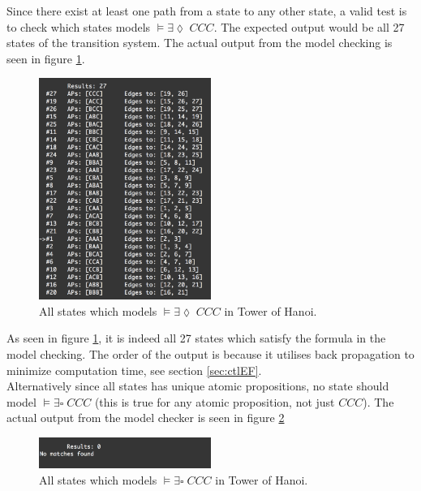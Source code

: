 Since there exist at least one path from a state to any other state, a valid test is to check which states models $\models \exists \lozenge \; CCC$. The expected output would be all 27 states of the transition system. The actual output from the model checking is seen in figure \ref{fig:tohEFCCC}.\\

\begin{figure}[H]
    \centering
    \includegraphics[width=0.5\textwidth]{fig/tohEFCCC.png}
    \caption{All states which models $\models \exists \lozenge \; CCC$ in Tower of Hanoi.}
    \label{fig:tohEFCCC}
\end{figure}

As seen in figure \ref{fig:tohEFCCC}, it is indeed all 27 states which satisfy the formula in the model checking. The order of the output is because it utilises back propagation to minimize computation time, see section \ref{sec:ctlEF}. \\

Alternatively since all states has unique atomic propositions, no state should model $\models \exists \square \; CCC$ (this is true for any atomic proposition, not just $CCC$). The actual output from the model checker is seen in figure \ref{fig:tohEGCCC}

\begin{figure}[H]
    \centering
    \includegraphics[width=0.5\textwidth]{fig/tohEGCCC.png}
    \caption{All states which models $\models \exists \square \; CCC$ in Tower of Hanoi.}
    \label{fig:tohEGCCC}
\end{figure}

